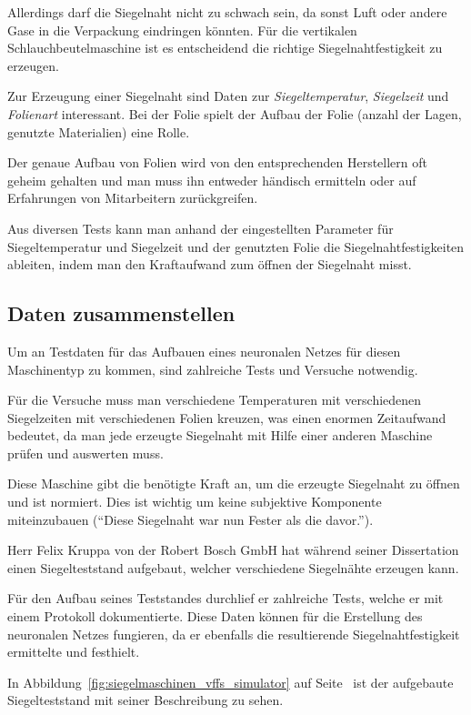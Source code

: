 Allerdings darf die Siegelnaht nicht zu schwach sein, da sonst Luft oder andere Gase in die Verpackung eindringen
könnten. Für die vertikalen Schlauchbeutelmaschine ist es entscheidend die richtige Siegelnahtfestigkeit zu erzeugen.

Zur Erzeugung einer Siegelnaht sind Daten zur \textit{Siegeltemperatur}, \textit{Siegelzeit} und \textit{Folienart}
interessant. Bei der Folie spielt der Aufbau der Folie (anzahl der Lagen, genutzte Materialien) eine Rolle.

Der genaue Aufbau von Folien wird von den entsprechenden Herstellern oft geheim gehalten und man muss ihn entweder
händisch ermitteln oder auf Erfahrungen von Mitarbeitern zurückgreifen.

Aus diversen Tests kann man anhand der eingestellten Parameter für Siegeltemperatur und Siegelzeit und der genutzten
Folie die Siegelnahtfestigkeiten ableiten, indem man den Kraftaufwand zum öffnen der Siegelnaht misst.

\subsection{Daten zusammenstellen}
Um an Testdaten für das Aufbauen eines neuronalen Netzes für diesen Maschinentyp zu kommen, sind zahlreiche Tests und
Versuche notwendig.

Für die Versuche muss man verschiedene Temperaturen mit verschiedenen Siegelzeiten mit verschiedenen Folien kreuzen, was
einen enormen Zeitaufwand bedeutet, da man jede erzeugte Siegelnaht mit Hilfe einer anderen Maschine prüfen und
auswerten muss.

Diese Maschine gibt die benötigte Kraft an, um die erzeugte Siegelnaht zu öffnen und ist normiert. Dies ist wichtig um
keine subjektive Komponente miteinzubauen (\enquote{Diese Siegelnaht war nun Fester als die davor.}).

Herr Felix Kruppa von der Robert Bosch GmbH hat während seiner Dissertation einen Siegelteststand aufgebaut, welcher
verschiedene Siegelnähte erzeugen kann.

Für den Aufbau seines Teststandes durchlief er zahlreiche Tests, welche er mit einem Protokoll dokumentierte. Diese
Daten können für die Erstellung des neuronalen Netzes fungieren, da er ebenfalls die resultierende Siegelnahtfestigkeit
ermittelte und festhielt.

In Abbildung~\ref{fig:siegelmaschinen_vffs_simulator} auf Seite~\pageref{fig:siegelmaschinen_vffs_simulator} ist der
aufgebaute Siegelteststand mit seiner Beschreibung zu sehen.

